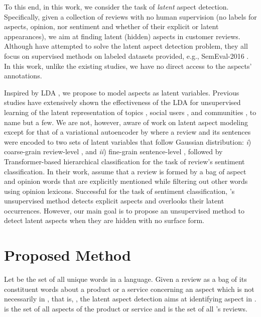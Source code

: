 \documentclass[11pt]{article}
\begin{document}
To this end, in this work, we consider the task of \textit{latent} aspect detection. Specifically, given a collection of reviews with no human supervision (no labels for aspects, opinion, nor sentiment and whether of their explicit or latent appearances), we aim at finding latent (hidden) aspects in customer reviews. Although \citet{Marrese_Taylor_2013, Poria_2014, Chen_2016, Wan_2020} have attempted to solve the latent aspect detection problem, they all focus on supervised methods on labeled datasets provided, e.g., SemEval-2016 \cite{Pontiki_2016}. In this work, unlike the existing studies, we have no direct access to the aspects' annotations. 

Inspired by LDA \cite{Blei_2003}, we propose to model aspects as latent variables. Previous studies have extensively shown the effectiveness of the LDA for unsupervised learning of the latent representation of topics \cite{Cheng_2014}, social users \cite{Sun_2017}, and communities \cite{Xianghua_2013,Yonggan_Li_2016}, to name but a few. We are not, however, aware of work on latent aspect modeling except for that of a variational autoencoder by \cite{Fei_2021} where a review  and its sentences  were encoded to two sets of latent variables that follow Gaussian distribution: \textit{i}) coarse-grain review-level , and \textit{ii}) fine-grain sentence-level , followed by Transformer-based hierarchical classification for the task of review's sentiment classification. In their work, \citet{Fei_2021} assume that a review is formed by a bag of aspect and opinion words that are explicitly mentioned while filtering out other words using opinion lexicons. Successful for the task of sentiment classification, \citet{Fei_2021}'s unsupervised method detects explicit aspects and overlooks their latent occurrences. However, our main goal is to propose an unsupervised method to detect latent aspects when they are hidden with no surface form. 


\section{Proposed Method}
Let  be the set of all unique words in a language. Given a review  as a bag of its constituent words about a product or a service  concerning an aspect  which is not necessarily in , that is, , the latent aspect detection aims at identifying aspect  in .  is the set of all aspects of the product or service  and  is the set of all 's reviews. 
\end{document}
